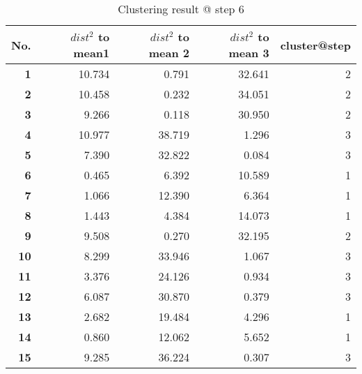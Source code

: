 \begin{table}[htbp]
  \centering
  \caption{Clustering result @ step 6}
    \begin{tabular}{rrrrr}
    \toprule
    \textbf{No.} & \textbf{$dist^2$ to mean1} & \textbf{$dist^2$ to mean 2} & \textbf{$dist^2$ to mean 3} & \textbf{cluster@step} \\
    \midrule
    \textbf{1} & 10.734  & 0.791  & 32.641  & 2 \\
    \textbf{2} & 10.458  & 0.232  & 34.051  & 2 \\
    \textbf{3} & 9.266  & 0.118  & 30.950  & 2 \\
    \textbf{4} & 10.977  & 38.719  & 1.296  & 3 \\
    \textbf{5} & 7.390  & 32.822  & 0.084  & 3 \\
    \textbf{6} & 0.465  & 6.392  & 10.589  & 1 \\
    \textbf{7} & 1.066  & 12.390  & 6.364  & 1 \\
    \textbf{8} & 1.443  & 4.384  & 14.073  & 1 \\
    \textbf{9} & 9.508  & 0.270  & 32.195  & 2 \\
    \textbf{10} & 8.299  & 33.946  & 1.067  & 3 \\
    \textbf{11} & 3.376  & 24.126  & 0.934  & 3 \\
    \textbf{12} & 6.087  & 30.870  & 0.379  & 3 \\
    \textbf{13} & 2.682  & 19.484  & 4.296  & 1 \\
    \textbf{14} & 0.860  & 12.062  & 5.652  & 1 \\
    \textbf{15} & 9.285  & 36.224  & 0.307  & 3 \\
    \bottomrule
    \end{tabular}%
  \label{tab:cluster_b6}%
\end{table}%
